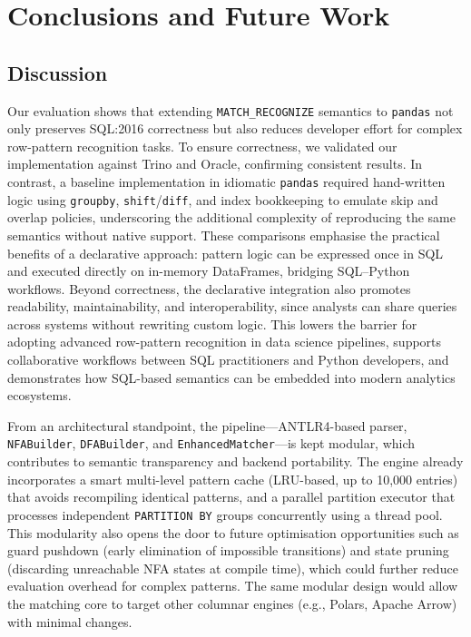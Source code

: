 \chapter{Conclusions and Future Work}
\label{chap:conclusions}

\section{Discussion}
\label{sec:discussion}

Our evaluation shows that extending \texttt{MATCH\_RECOGNIZE} semantics
to \texttt{pandas} not only preserves SQL:2016 correctness but also
reduces developer effort for complex row-pattern recognition tasks.
To ensure correctness, we validated our implementation against Trino
and Oracle, confirming consistent results.  In contrast, a baseline
implementation in idiomatic \texttt{pandas} required hand-written
logic using \texttt{groupby}, \texttt{shift}/\texttt{diff}, and index
bookkeeping to emulate skip and overlap policies, underscoring the
additional complexity of reproducing the same semantics without native
support.  These comparisons emphasise the practical benefits of a
declarative approach: pattern logic can be expressed once in SQL and
executed directly on in-memory DataFrames, bridging SQL--Python
workflows.  Beyond correctness, the declarative integration also
promotes readability, maintainability, and interoperability, since
analysts can share queries across systems without rewriting custom
logic.  This lowers the barrier for adopting advanced row-pattern
recognition in data science pipelines, supports collaborative
workflows between SQL practitioners and Python developers, and
demonstrates how SQL-based semantics can be embedded into modern
analytics ecosystems.

From an architectural standpoint, the pipeline---ANTLR4-based parser,
\texttt{NFABuilder}, \texttt{DFABuilder}, and
\texttt{EnhancedMatcher}---is kept modular, which contributes to
semantic transparency and backend portability.  The engine already
incorporates a smart multi-level pattern cache (LRU-based, up to
10{,}000 entries) that avoids recompiling identical patterns, and a
parallel partition executor that processes independent
\texttt{PARTITION BY} groups concurrently using a thread pool.
This modularity also opens the door to future optimisation
opportunities such as guard pushdown (early elimination of impossible
transitions) and state pruning (discarding unreachable NFA states at
compile time), which could further reduce evaluation overhead for
complex patterns.  The same modular design would allow the matching
core to target other columnar engines (e.g., Polars, Apache Arrow)
with minimal changes.

